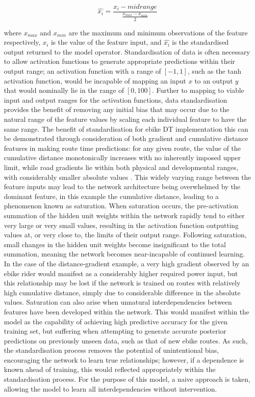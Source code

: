 \documentclass[a4paper, 10pt]{article}
\numberwithin{equation}{section}
\begin{document}
\begin{equation}
\label{eq:nn:standardise}
    \hat{x_{i}} = \frac{x_i - midrange}{\frac{x_{max} - x_{min}}{2}}
\end{equation}

where $x_{max}$ and $x_{min}$ are the maximum and minimum observations of the feature respectively, $x_{i}$ is the value of the feature input, and $\hat{x_{i}}$ is the standardised output returned to the model operator. Standardisation of data is often necessary to allow activation functions to generate appropriate predictions within their output range; an activation function with a range of $[-1,1]$, such as the tanh activation function, would be incapable of mapping an input $x$ to an output $y$ that would nominally lie in the range of $[0,100]$. Further to mapping to viable input and output ranges for the activation functions, data standardisation provides the benefit of removing any initial bias that may occur due to the natural range of the feature values by scaling each individual feature to have the same range. The benefit of standardisation for ebike DT implementation this can be demonstrated through consideration of both gradient and cumulative distance features in making route time predictions: for any given route, the value of the cumulative distance monotonically increases with no inherently imposed upper limit, while road gradients lie within both physical and developmental ranges, with considerably smaller absolute values \cite{nn:hill_gradients}. This widely varying range between the feature inputs may lead to the network architecture being overwhelmed by the dominant feature, in this example the cumulative distance, leading to a phenomenon known as saturation. When saturation occurs, the pre-activation summation of the hidden unit weights within the network rapidly tend to either very large or very small values, resulting in the activation function outputting values at, or very close to, the limits of their output range. Following saturation, small changes in the hidden unit weights become insignificant to the total summation, meaning the network becomes near-incapable of continued learning. In the case of the distance-gradient example, a very high gradient observed by an ebike rider would manifest as a considerably higher required power input, but this relationship may be lost if the network is trained on routes with relatively high cumulative distance, simply due to considerable difference in the absolute values. Saturation can also arise when unnatural interdependencies between features have been developed within the network. This would manifest within the model as the capability of achieving high predictive accuracy for the given training set, but suffering when attempting to generate accurate posterior predictions on previously unseen data, such as that of new ebike routes. As such, the standardisation process removes the potential of unintentional bias, encouraging the network to learn true relationships; however, if a dependence is known ahead of training, this would reflected appropriately within the standardisation process. For the purpose of this model, a naive approach is taken, allowing the model to learn all interdependencies without intervention.\medbreak
\end{document}

